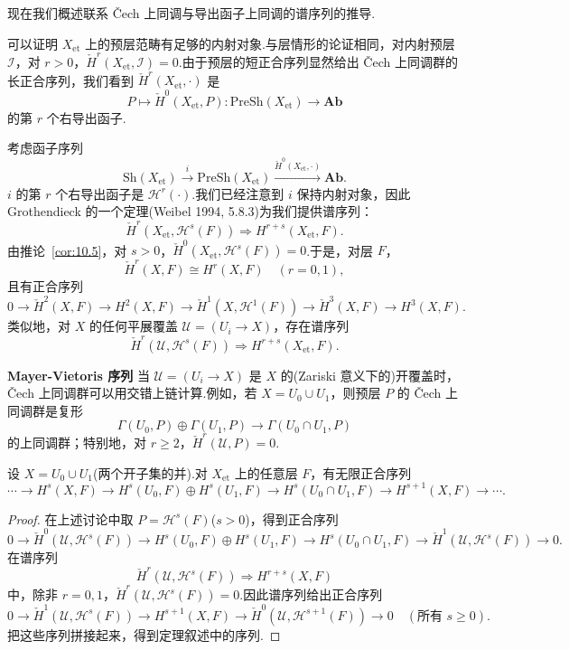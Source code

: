现在我们概述联系 \v{C}ech 上同调与导出函子上同调的谱序列的推导.

可以证明 $X_{\mathrm{et}}$ 上的预层范畴有足够的内射对象.与层情形的论证相同，对内射预层 $\mathcal{I}$，对 $r > 0$，$\check{H}^{r}(X_{\mathrm{et}}, \mathcal{I}) = 0$.由于预层的短正合序列显然给出 \v{C}ech 上同调群的长正合序列，我们看到 $\check{H}^{r}(X_{\mathrm{et}}, \cdot)$ 是
\[
P \mapsto \check{H}^{0}(X_{\mathrm{et}}, P) \colon \mathrm{PreSh}(X_{\mathrm{et}}) \to \mathbf{Ab}
\]
的第 $r$ 个右导出函子.

考虑函子序列
\[
\mathrm{Sh}(X_{\mathrm{et}}) \xrightarrow{i} \mathrm{PreSh}(X_{\mathrm{et}}) \xrightarrow{\check{H}^{0}(X_{\mathrm{et}}, \cdot)} \mathbf{Ab}.
\]
$i$ 的第 $r$ 个右导出函子是 $\mathcal{H}^{r}(\cdot)$.我们已经注意到 $i$ 保持内射对象，因此 Grothendieck 的一个定理(Weibel 1994, 5.8.3)为我们提供谱序列：
\[
\check{H}^{r}(X_{\mathrm{et}}, \mathcal{H}^{s}(F)) \Rightarrow H^{r+s}(X_{\mathrm{et}}, F).
\]
由推论~\ref{cor:10.5}，对 $s > 0$，$\check{H}^{0}(X_{\mathrm{et}}, \mathcal{H}^{s}(F)) = 0$.于是，对层 $F$，
\[
\check{H}^{r}(X, F) \cong H^{r}(X, F) \quad (r = 0, 1),
\]
且有正合序列
\[
0 \to \check{H}^{2}(X, F) \to H^{2}(X, F) \to \check{H}^{1}(X, \mathcal{H}^{1}(F)) \to \check{H}^{3}(X, F) \to H^{3}(X, F).
\]
类似地，对 $X$ 的任何平展覆盖 $\mathcal{U} = (U_i \to X)$，存在谱序列
\[
\check{H}^{r}(\mathcal{U}, \mathcal{H}^{s}(F)) \Rightarrow H^{r+s}(X_{\mathrm{et}}, F).
\]

\textbf{Mayer-Vietoris 序列} 当 $\mathcal{U} = (U_i \to X)$ 是 $X$ 的(Zariski 意义下的)开覆盖时，\v{C}ech 上同调群可以用交错上链计算.例如，若 $X = U_0 \cup U_1$，则预层 $P$ 的 \v{C}ech 上同调群是复形
\[
\Gamma(U_0, P) \oplus \Gamma(U_1, P) \to \Gamma(U_0 \cap U_1, P)
\]
的上同调群；特别地，对 $r \geq 2$，$\check{H}^{r}(\mathcal{U}, P) = 0$.

\begin{theorem}\label{thm:10.8}
设 $X = U_0 \cup U_1$(两个开子集的并).对 $X_{\mathrm{et}}$ 上的任意层 $F$，有无限正合序列
\[
\cdots \to H^{s}(X, F) \to H^{s}(U_0, F) \oplus H^{s}(U_1, F) \to H^{s}(U_0 \cap U_1, F) \to H^{s+1}(X, F) \to \cdots.
\]
\end{theorem}

\begin{proof}
在上述讨论中取 $P = \mathcal{H}^{s}(F)$($s > 0$)，得到正合序列
\[
0 \to \check{H}^{0}(\mathcal{U}, \mathcal{H}^{s}(F)) \to H^{s}(U_0, F) \oplus H^{s}(U_1, F) \to H^{s}(U_0 \cap U_1, F) \to \check{H}^{1}(\mathcal{U}, \mathcal{H}^{s}(F)) \to 0.
\]
在谱序列
\[
\check{H}^{r}(\mathcal{U}, \mathcal{H}^{s}(F)) \Rightarrow H^{r+s}(X, F)
\]
中，除非 $r = 0, 1$，$\check{H}^{r}(\mathcal{U}, \mathcal{H}^{s}(F)) = 0$.因此谱序列给出正合序列
\[
0 \to \check{H}^{1}(\mathcal{U}, \mathcal{H}^{s}(F)) \to H^{s+1}(X, F) \to \check{H}^{0}(\mathcal{U}, \mathcal{H}^{s+1}(F)) \to 0 \quad (\text{所有 } s \geq 0).
\]
把这些序列拼接起来，得到定理叙述中的序列.
\end{proof}

